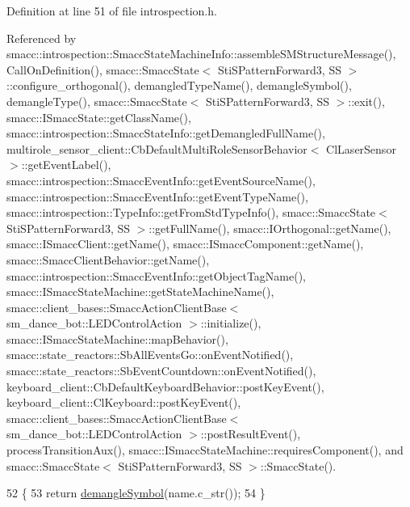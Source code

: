 Definition at line 51 of file introspection.\+h.



Referenced by smacc\+::introspection\+::\+Smacc\+State\+Machine\+Info\+::assemble\+S\+M\+Structure\+Message(), Call\+On\+Definition(), smacc\+::\+Smacc\+State$<$ Sti\+S\+Pattern\+Forward3, S\+S $>$\+::configure\+\_\+orthogonal(), demangled\+Type\+Name(), demangle\+Symbol(), demangle\+Type(), smacc\+::\+Smacc\+State$<$ Sti\+S\+Pattern\+Forward3, S\+S $>$\+::exit(), smacc\+::\+I\+Smacc\+State\+::get\+Class\+Name(), smacc\+::introspection\+::\+Smacc\+State\+Info\+::get\+Demangled\+Full\+Name(), multirole\+\_\+sensor\+\_\+client\+::\+Cb\+Default\+Multi\+Role\+Sensor\+Behavior$<$ Cl\+Laser\+Sensor $>$\+::get\+Event\+Label(), smacc\+::introspection\+::\+Smacc\+Event\+Info\+::get\+Event\+Source\+Name(), smacc\+::introspection\+::\+Smacc\+Event\+Info\+::get\+Event\+Type\+Name(), smacc\+::introspection\+::\+Type\+Info\+::get\+From\+Std\+Type\+Info(), smacc\+::\+Smacc\+State$<$ Sti\+S\+Pattern\+Forward3, S\+S $>$\+::get\+Full\+Name(), smacc\+::\+I\+Orthogonal\+::get\+Name(), smacc\+::\+I\+Smacc\+Client\+::get\+Name(), smacc\+::\+I\+Smacc\+Component\+::get\+Name(), smacc\+::\+Smacc\+Client\+Behavior\+::get\+Name(), smacc\+::introspection\+::\+Smacc\+Event\+Info\+::get\+Object\+Tag\+Name(), smacc\+::\+I\+Smacc\+State\+Machine\+::get\+State\+Machine\+Name(), smacc\+::client\+\_\+bases\+::\+Smacc\+Action\+Client\+Base$<$ sm\+\_\+dance\+\_\+bot\+::\+L\+E\+D\+Control\+Action $>$\+::initialize(), smacc\+::\+I\+Smacc\+State\+Machine\+::map\+Behavior(), smacc\+::state\+\_\+reactors\+::\+Sb\+All\+Events\+Go\+::on\+Event\+Notified(), smacc\+::state\+\_\+reactors\+::\+Sb\+Event\+Countdown\+::on\+Event\+Notified(), keyboard\+\_\+client\+::\+Cb\+Default\+Keyboard\+Behavior\+::post\+Key\+Event(), keyboard\+\_\+client\+::\+Cl\+Keyboard\+::post\+Key\+Event(), smacc\+::client\+\_\+bases\+::\+Smacc\+Action\+Client\+Base$<$ sm\+\_\+dance\+\_\+bot\+::\+L\+E\+D\+Control\+Action $>$\+::post\+Result\+Event(), process\+Transition\+Aux(), smacc\+::\+I\+Smacc\+State\+Machine\+::requires\+Component(), and smacc\+::\+Smacc\+State$<$ Sti\+S\+Pattern\+Forward3, S\+S $>$\+::\+Smacc\+State().


\begin{DoxyCode}
52 \{
53     \textcolor{keywordflow}{return} \hyperlink{namespacesmacc_1_1introspection_aa9158a0ff0cfe83a59877e6af7d7f873}{demangleSymbol}(name.c\_str());
54 \}
\end{DoxyCode}


